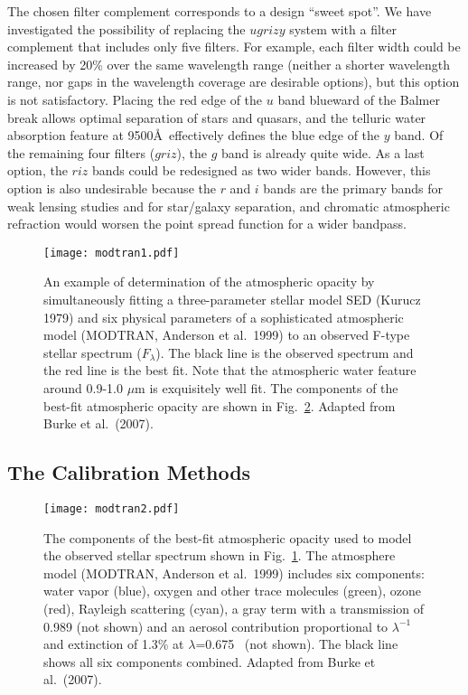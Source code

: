 The chosen filter complement corresponds to a design ``sweet spot''. We have
investigated the possibility of replacing the $ugrizy$ system with a
filter complement that includes only five filters. For example, each filter
width could be increased by 20\% over the same wavelength range (neither a
shorter wavelength range, nor gaps in the wavelength coverage are desirable
options), but this option is not satisfactory. Placing the red edge of the $u$
band blueward of the Balmer break allows optimal separation of stars and
quasars, and the telluric water absorption feature at 9500\AA\
effectively defines the blue edge of the $y$ band. Of the remaining four
filters ($griz$), the $g$ band is already quite wide. As a last option, the
$riz$ bands could be redesigned as two wider bands. However, this option is also
undesirable because the $r$ and $i$ bands are the primary bands for weak
lensing studies and for star/galaxy separation, and chromatic atmospheric
refraction would worsen the point spread function for a wider bandpass.


\begin{figure}
\texttt{[image: modtran1.pdf]}
\caption{An example of determination of the atmospheric opacity by
simultaneously fitting a three-parameter stellar model SED (Kurucz 1979) and
six physical parameters of a sophisticated atmospheric model (MODTRAN, Anderson
et al.~1999) to an observed F-type stellar spectrum ($F_\lambda$). The black
line is the observed spectrum and the red line is the best fit. Note that the
atmospheric water feature around 0.9-1.0 $\mu$m is exquisitely well fit.
The components of the best-fit atmospheric opacity are shown in
Fig.~\ref{Fig:modtran2}. Adapted from Burke et al.~(2007).}
\label{Fig:modtran1}
\end{figure}

\subsection{ The Calibration Methods }



\begin{figure}
\texttt{[image: modtran2.pdf]}
\caption{The components of the best-fit atmospheric opacity used to
model the observed stellar spectrum shown in Fig.~\ref{Fig:modtran1}.
The atmosphere model (MODTRAN, Anderson et al.~1999) includes six
components: water vapor (blue), oxygen and other trace molecules
(green), ozone (red), Rayleigh scattering (cyan), a gray term
with a transmission of 0.989 (not shown) and an aerosol contribution
proportional to $\lambda^{-1}$ and extinction of 1.3\% at $\lambda$=0.675 \mic\
(not shown). The black line shows all six components combined.
Adapted from Burke et al.~(2007).}
\label{Fig:modtran2}
\end{figure}


